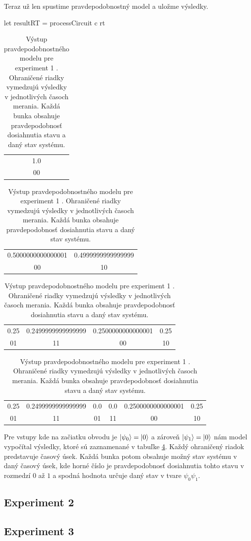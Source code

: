Teraz už len spustime pravdepodobnostný model a uložme výsledky.
\begin{code}
let resultRT = processCircuit c rt
\end{code}

\begin{table}
\centering
\begin{tabular}{|c|}
\hline
1.0 \\ 
00 \\ 
\hline
\end{tabular}

\begin{tabular}{|c|c|}
\hline
0.5000000000000001 & 0.4999999999999999 \\ 
00 & 10 \\ 
\hline
\end{tabular}

\begin{tabular}{|c|c|c|c|}
\hline
0.25 & 0.2499999999999999 & 0.2500000000000001 & 0.25 \\ 
01 & 11 & 00 & 10 \\ 
\hline
\end{tabular}

\begin{tabular}{|c|c|c|c|c|c|}
\hline
0.25 & 0.2499999999999999 & 0.0 & 0.0 & 0.2500000000000001 & 0.25 \\ 
01 & 11 & 01 & 11 & 00 & 10 \\ 
\hline
\end{tabular}
\caption{\label{expr1_vystup} Výstup pravdepodobnostného modelu pre experiment 1
. Ohraničené riadky vymedzujú výsledky v jednotlivých časoch merania. Každá
bunka obsahuje pravdepodobnosť dosiahnutia stavu a daný stav systému.}
\end{table}

Pre vstupy kde na začiatku obvodu je \(\ket{\psi_0} = \ket{0}\) a zároveň
\(\ket{\psi_1} = \ket{0}\) nám model vypočítal výsledky, ktoré sú zaznamenané
v tabuľke \ref{expr1_vystup}. Každý ohraničený riadok predstavuje časový úsek.
Každá bunka potom obsahuje možný stav systému v daný časový úsek, kde horné
číslo je pravdepodobnosť dosiahnutia tohto stavu v rozmedzí \(0\) až \(1\) a 
spodná hodnota určuje daný stav v tvare \(\psi_0\psi_1\).

\subsection{Experiment 2}
\subsection{Experiment 3}
